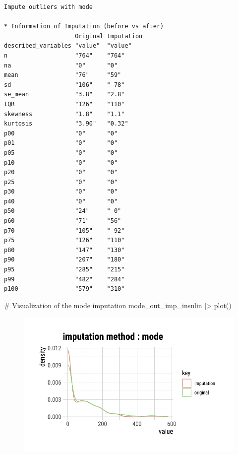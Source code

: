 \documentclass[
  letterpaper,
  DIV=11,
  numbers=noendperiod]{scrreprt}
\newenvironment{Shaded}{\begin{snugshade}}{\end{snugshade}}
\newcommand{\CommentTok}[1]{\textcolor[rgb]{0.37,0.37,0.37}{#1}}
\newcommand{\FunctionTok}[1]{\textcolor[rgb]{0.28,0.35,0.67}{#1}}
\newcommand{\NormalTok}[1]{\textcolor[rgb]{0.00,0.23,0.31}{#1}}
\newcommand{\SpecialCharTok}[1]{\textcolor[rgb]{0.37,0.37,0.37}{#1}}
\begin{document}
\begin{verbatim}
Impute outliers with mode

* Information of Imputation (before vs after)
                    Original Imputation
described_variables "value"  "value"   
n                   "764"    "764"     
na                  "0"      "0"       
mean                "76"     "59"      
sd                  "106"    " 78"     
se_mean             "3.8"    "2.8"     
IQR                 "126"    "110"     
skewness            "1.8"    "1.1"     
kurtosis            "3.90"   "0.32"    
p00                 "0"      "0"       
p01                 "0"      "0"       
p05                 "0"      "0"       
p10                 "0"      "0"       
p20                 "0"      "0"       
p25                 "0"      "0"       
p30                 "0"      "0"       
p40                 "0"      "0"       
p50                 "24"     " 0"      
p60                 "71"     "56"      
p70                 "105"    " 92"     
p75                 "126"    "110"     
p80                 "147"    "130"     
p90                 "207"    "180"     
p95                 "285"    "215"     
p99                 "482"    "284"     
p100                "579"    "310"     
\end{verbatim}

\begin{Shaded}
\begin{Highlighting}[]
\CommentTok{\# Visualization of the mode imputation}
\NormalTok{mode\_out\_imp\_insulin }\SpecialCharTok{|\textgreater{}}
\FunctionTok{plot}\NormalTok{()}
\end{Highlighting}
\end{Shaded}

\begin{figure}[H]

{\centering \includegraphics{./ImputatingLikeDataScientist_files/figure-pdf/unnamed-chunk-16-1.pdf}

}

\end{figure}
\end{document}

